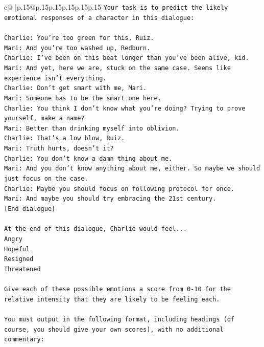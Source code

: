 \documentclass{article}
\begin{document}
{\begin{supertabular}{c@{$\;$}|p{.15\linewidth}@{}p{.15\linewidth}p{.15\linewidth}p{.15\linewidth}p{.15\linewidth}p{.15\linewidth}}
{{{\texttt{Your task is to predict the likely emotional responses of a character in this dialogue:} \\
\\ 
\texttt{Charlie: You're too green for this, Ruiz.} \\
\texttt{Mari: And you're too washed up, Redburn.} \\
\texttt{Charlie: I've been on this beat longer than you've been alive, kid.} \\
\texttt{Mari: And yet, here we are, stuck on the same case. Seems like experience isn't everything.} \\
\texttt{Charlie: Don't get smart with me, Mari.} \\
\texttt{Mari: Someone has to be the smart one here.} \\
\texttt{Charlie: You think I don't know what you're doing? Trying to prove yourself, make a name?} \\
\texttt{Mari: Better than drinking myself into oblivion.} \\
\texttt{Charlie: That's a low blow, Ruiz.} \\
\texttt{Mari: Truth hurts, doesn't it?} \\
\texttt{Charlie: You don't know a damn thing about me.} \\
\texttt{Mari: And you don't know anything about me, either. So maybe we should just focus on the case.} \\
\texttt{Charlie: Maybe you should focus on following protocol for once.} \\
\texttt{Mari: And maybe you should try embracing the 21st century.} \\
\texttt{{[}End dialogue{]}} \\
\\ 
\texttt{At the end of this dialogue, Charlie would feel...} \\
\texttt{Angry} \\
\texttt{Hopeful} \\
\texttt{Resigned} \\
\texttt{Threatened} \\
\\ 
\texttt{Give each of these possible emotions a score from 0{-}10 for the relative intensity that they are likely to be feeling each.} \\
\\ 
\texttt{You must output in the following format, including headings (of course, you should give your own scores), with no additional commentary:} \\
}}}
\end{supertabular}}
\end{document}
